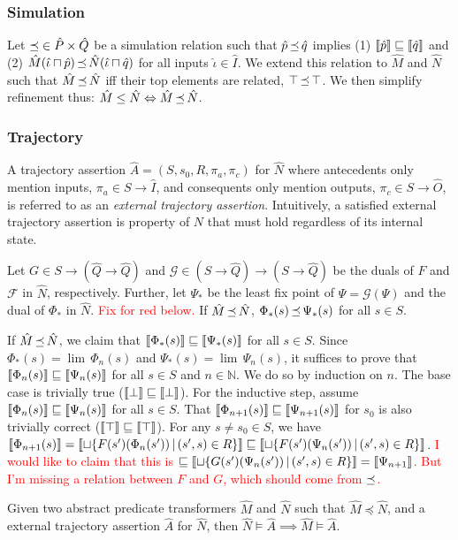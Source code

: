 \subsubsection{Simulation} Let $\operatorname{\preceq} \in \hat P \times \hat Q$ be a simulation relation such that $\hat p \operatorname{\preceq} \hat q$ implies (1) $\llbracket\hat p\rrbracket \sqsubseteq \llbracket\hat q\rrbracket$ and (2) $\hat M(\hat \iota \sqcap \hat p) \operatorname{\preceq} \hat N(\hat \iota \sqcap \hat q)$ for all inputs $\hat \iota \in \hat I$. We extend this relation to $\hat M$ and $\hat N$ such that $\hat M \operatorname{\preceq} \hat N$ iff their top elements are related, $\top \operatorname{\preceq} \top$. We then simplify refinement thus: $\hat M \leq \hat N \Leftrightarrow \hat M \operatorname{\preceq} \hat N$.


\subsubsection{Trajectory} A trajectory assertion $\hat A = (S,s_{0},R,\pi_{a},\pi_{c})$ for $\hat N$ where antecedents only mention inputs, $\pi_{a} \in S \rightarrow \hat I$, and consequents only mention outputs, $\pi_{c} \in S \rightarrow \hat O$, is referred to as an \textit{external trajectory assertion}. Intuitively, a satisfied external trajectory assertion is property of $N$ that must hold regardless of its internal state.

Let $G \in S \rightarrow (\hat Q \rightarrow \hat Q)$ and $\mathcal{G} \in (S \rightarrow \hat Q) \rightarrow (S \rightarrow \hat Q)$ be the duals of $F$ and $\mathcal{F}$ in $\hat N$, respectively. Further, let $\Psi_{*}$ be the least fix point of $\Psi = \mathcal{G}(\Psi)$ and the dual of $\Phi_{*}$ in $\hat N$. \textcolor{red}{Fix for red below.} If $\hat M \operatorname{\preceq} \hat N$, $\Phi_{*}(s) \operatorname{\preceq} \Psi_{*}(s)$ for all $s \in S$.

If $\hat M \operatorname{\preceq} \hat N$, we claim that $\llbracket\Phi_{*}(s)\rrbracket \sqsubseteq \llbracket\Psi_{*}(s)\rrbracket$ for all $s \in S$. Since $\Phi_{*}(s) = \lim \, \Phi_{n}(s)$ and $\Psi_{*}(s) = \lim \, \Psi_{n}(s)$, it suffices to prove that $\llbracket\Phi_{n}(s)\rrbracket \sqsubseteq \llbracket\Psi_{n}(s)\rrbracket$ for all $s \in S$ and $n \in \mathbb{N}$. We do so by induction on $n$. The base case is trivially true ($\llbracket\bot\rrbracket \sqsubseteq \llbracket\bot\rrbracket$). For the inductive step, assume $\llbracket\Phi_{n}(s)\rrbracket \sqsubseteq \llbracket\Psi_{n}(s)\rrbracket$ for all $s \in S$. That $\llbracket\Phi_{n+1}(s)\rrbracket \sqsubseteq \llbracket\Psi_{n+1}(s)\rrbracket$ for $s_{0}$ is also trivially correct ($\llbracket\top\rrbracket \sqsubseteq \llbracket\top\rrbracket$). For any $s \neq s_{0} \in S$, we have $\llbracket\Phi_{n+1}(s)\rrbracket = \llbracket\sqcup \{ F(s')(\Phi_{n}(s')) \, | \, (s',s) \in R \}\rrbracket \sqsubseteq \llbracket\sqcup \{ F(s')(\Psi_{n}(s')) \, | \, (s',s) \in R \}\rrbracket$. \textcolor{red}{I would like to claim that this is $\sqsubseteq \llbracket\sqcup \{ G(s')(\Psi_{n}(s')) \, | \, (s',s) \in R \}\rrbracket = \llbracket\Psi_{n+1}\rrbracket$. But I'm missing a relation between $F$ and $G$, which should come from $\operatorname{\preceq}$.}

\begin{theorem}
Given two abstract predicate transformers $\hat M$ and $\hat N$ such that $\hat M \preceq \hat N$, and a external trajectory assertion $\hat A$ for $\hat N$, then $\hat N \models \hat A \implies \hat M \models \hat A$.
\end{theorem}


